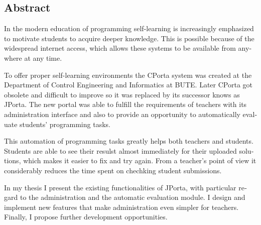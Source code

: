\begin{otherlanguage}{english}
\chapter*{Abstract}%

In the modern education of programming self-learning is increasingly emphasized to motivate students to acquire deeper knowledge. This is possible because of the widespread internet access, which allows these systems to be available from anywhere at any time. 

To offer proper self-learning environments the CPorta system was created at the Department of Control Engineering and Informatics at BUTE. Later CPorta got obsolete and difficult to improve so it was replaced by its successor knows as JPorta. The new portal was able to fulfill the requirements of teachers with its administration interface and also to provide an opportunity to automatically evaluate students' programming tasks.

This automation of programming tasks greatly helps both teachers and students. Students are able to see their resulst almost immediately for their uploaded solutions, which makes it easier to fix and try again. From a teacher's point of view it considerably reduces the time spent on chechking student submissions.

In my thesis I present the existing functionalities of JPorta, with particular regard to the administration and the automatic evaluation module. I design and implement new features that make administration even simpler for teachers. Finally, I propose further development opportunities.

\end{otherlanguage}
\vfill

